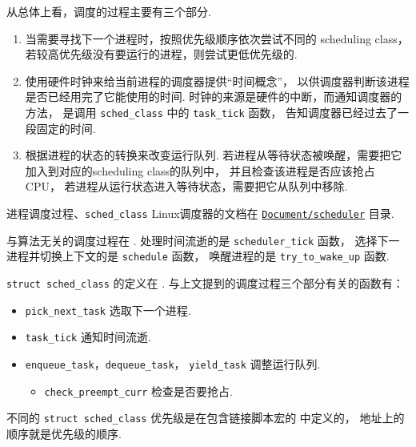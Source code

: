 从总体上看，调度的过程主要有三个部分.
\begin{enumerate}
	\item 当需要寻找下一个进程时，按照优先级顺序依次尝试不同的 scheduling class，
	      若较高优先级没有要运行的进程，则尝试更低优先级的.
	\item 使用硬件时钟来给当前进程的调度器提供“时间概念”，
	      以供调度器判断该进程是否已经用完了它能使用的时间.
	      时钟的来源是硬件的中断，而通知调度器的方法，
	      是调用 \lstinline{sched_class} 中的 \lstinline{task_tick} 函数，
	      告知调度器已经过去了一段固定的时间.
	\item 根据进程的状态的转换来改变运行队列.
	      若进程从等待状态被唤醒，需要把它加入到对应的scheduling class的队列中，
	      并且检查该进程是否应该抢占CPU，
	      若进程从运行状态进入等待状态，需要把它从队列中移除.
\end{enumerate}

\begin{readsrcbox}{进程调度过程、\lstinline{sched_class}}
	Linux调度器的文档在
	\href{https://docs.kernel.org/scheduler/index.html}{\lstinline{Document/scheduler}}
	目录.

	与算法无关的调度过程在 .
	处理时间流逝的是 \lstinline{scheduler_tick} 函数，
	选择下一进程并切换上下文的是 \lstinline{schedule} 函数，
	唤醒进程的是 \lstinline{try_to_wake_up} 函数.

	\lstinline{struct sched_class} 的定义在 .
	与上文提到的调度过程三个部分有关的函数有：
	\begin{itemize}
		\item \lstinline{pick_next_task} 选取下一个进程.
		\item \lstinline{task_tick} 通知时间流逝.
		\item \lstinline{enqueue_task}，\lstinline{dequeue_task}，
		      \lstinline{yield_task} 调整运行队列.
		      \begin{itemize}
			      \item \lstinline{check_preempt_curr} 检查是否要抢占.
		      \end{itemize}
	\end{itemize}

	不同的 \lstinline{struct sched_class} 优先级是在包含链接脚本宏的
	 中定义的，
	地址上的顺序就是优先级的顺序.
\end{readsrcbox}


